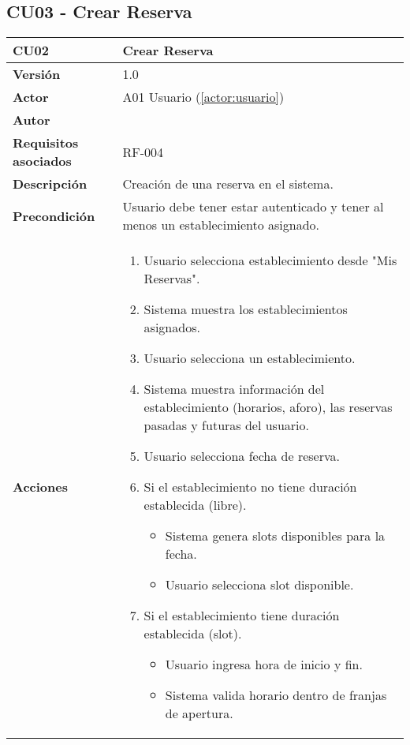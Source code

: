 \subsection{CU03 - Crear Reserva}

\begin{table}[H]
	\centering
	\begin{tabularx}{\linewidth}{ p{} p{} }
		\toprule
		\textbf{CU02}    & \textbf{Crear Reserva} \\
		\toprule
		\textbf{Versión}              & 1.0    \\
		\textbf{Actor}                & A01 Usuario (\ref{actor:usuario}) \\
		\textbf{Autor}                & \nombre \\
		\textbf{Requisitos asociados} & RF-004 \\
		\textbf{Descripción}          & Creación de una reserva en el sistema. \\
		\textbf{Precondición}         & Usuario debe tener estar autenticado y tener al menos un establecimiento asignado. \\
		\textbf{Acciones}             &
		\begin{enumerate}
			\def\labelenumi{\arabic{enumi}.}
			\tightlist
			\item Usuario selecciona establecimiento desde "Mis Reservas".
            \item Sistema muestra los establecimientos asignados.
            \item Usuario selecciona un establecimiento.
            \item Sistema muestra información del establecimiento (horarios, aforo), las reservas pasadas y futuras del usuario.
            \item Usuario selecciona fecha de reserva.
            \item Si el establecimiento no tiene duración establecida (libre).
   		\begin{itemize}
  			\item Sistema genera slots disponibles para la fecha.
			  \item Usuario selecciona slot disponible.
  		\end{itemize}
            \item Si el establecimiento tiene duración establecida (slot).
   		\begin{itemize}
  			\item Usuario ingresa hora de inicio y fin.
			  \item Sistema valida horario dentro de franjas de apertura.

\end{itemize}
\end{enumerate}
\end{tabularx}
\end{table}
